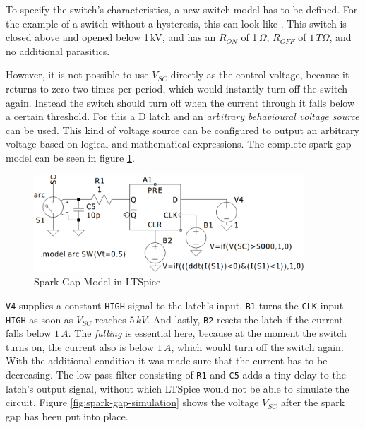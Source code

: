 To specify the switch's characteristics, a new switch model has to be defined. For the example of a switch without a hysteresis, this can look like . This switch is closed above and opened below 1\,kV, and has an \(R_{ON}\) of 1\,\(\Omega\), \(R_{OFF}\) of \(1\,T\Omega\), and no additional parasitics. 

However, it is not possible to use \(V_{SC}\) directly as the control voltage, because it returns to zero two times per period, which would instantly turn off the switch again. Instead the switch should turn off when the current through it falls below a certain threshold. For this a D latch and an \emph{arbitrary behavioural voltage source} can be used. This kind of voltage source can be configured to output an arbitrary voltage based on logical and mathematical expressions. The complete spark gap model can be seen in figure \ref{fig:ltspice-sparkgap}.

\begin{figure}[h!]
    \centering
    \includegraphics[width=0.9\textwidth]{simon/resources/ltspice_sparkgap.png}
    \caption{Spark Gap Model in LTSpice}
    \label{fig:ltspice-sparkgap}
\end{figure}

\texttt{V4} supplies a constant \texttt{HIGH} signal to the latch's input. \texttt{B1} turns the \texttt{CLK} input \texttt{HIGH} as soon as \(V_{SC}\) reaches \(5\,kV\). And lastly, \texttt{B2} resets the latch if the current falls below \(1\,A\). The \emph{falling} is essential here, because at the moment the switch turns on, the current also is below \(1\,A\), which would turn off the switch again. With the additional  condition it was made sure that the current has to be decreasing. The low pass filter consisting of \texttt{R1} and \texttt{C5} adds a tiny delay to the latch's output signal, without which LTSpice would not be able to simulate the circuit. Figure \ref{fig:spark-gap-simulation} shows the voltage \(V_{SC}\) after the spark gap has been put into place.

